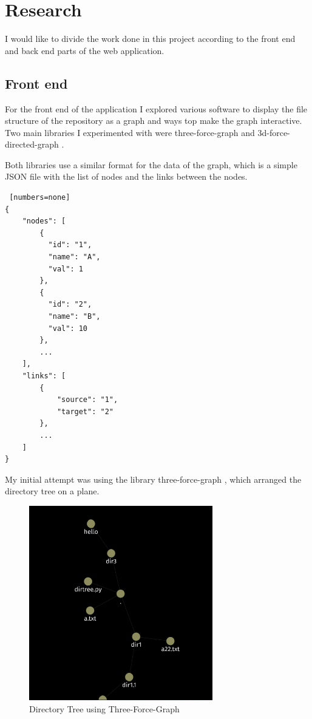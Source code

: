 \section{Research} \label{sec:research}

I would like to divide the work done in this project according to the front end and back end parts of the web application. 

\subsection{Front end}

For the front end of the application I explored various software to display the file structure of the repository as a graph and ways top make the graph interactive. Two main libraries I experimented with were three-force-graph \cite{threeforcegraph} and 3d-force-directed-graph \cite{3dforcegraph}.

Both libraries use a similar format for the data of the graph, which is a simple JSON file with the list of nodes and the links between the nodes.

\begin{lstlisting} [numbers=none]
{
    "nodes": [
        {
          "id": "1",
          "name": "A",
          "val": 1
        },
        {
          "id": "2",
          "name": "B",
          "val": 10
        },
        ...
    ],
    "links": [
        {
            "source": "1",
            "target": "2"
        },
        ...
    ]
}
\end{lstlisting}

My initial attempt was using the library three-force-graph \cite{threeforcegraph} , which arranged the directory tree on a plane. 

\begin{figure}[!htbp]
    \includegraphics[width=8cm]{figs/three-force-graph_sample.png}
    \centering
    \caption{Directory Tree using Three-Force-Graph}
    \label{fig:three-force-graph}
\end{figure}

